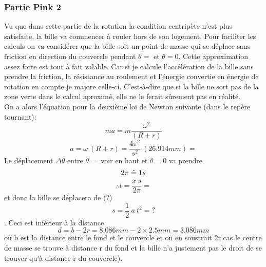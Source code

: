 \subsubsection{Partie Pink 2}
Vu que dans cette partie de la rotation la condition centripète n'est plus satisfaite, la bille va commencer à rouler hors de son logement. Pour faciliter les calculs on va considérer que la bille soit un point de masse qui se déplace sans friction en direction du couvercle pendant $\theta = $%
et $\theta = 0$. 
Cette approximation assez forte est tout à fait valable. Car si je calcule l'accélération de la bille sans prendre la friction, la résistance au roulement et l'énergie convertie en énergie de rotation en compte je majore celle-ci. C'est-à-dire que si la bille ne sort pas de la zone verte dans le calcul aproximé, elle ne le ferait sûrement pas en réalité.\\
On a alors l'équation pour la deuxième loi de Newton suivante (dans le repère tournant):
\[ma = m \frac{\omega^{2}}{(R + r)}\]
\[a = \omega \ (R + r) = \frac{4 \pi^{2}}{s^{2}} \ (26.914mm) = \]
Le déplacement $\Delta\theta$ entre $\theta =$ voir en haut et $\theta = 0$ va prendre
\[2 \pi \mathrel{\hat{=}} 1 s\]
\[\therefore t = \frac{x \ s}{2 \pi} = \]
et donc la bille se déplacera de (?) 
\[s = \frac{1}{2} \ a \ t^{2} = ? \]
.
Ceci est inférieur à la distance 
\[d = b - 2r = 8.086mm - 2 \times 2.5mm = 3.086mm\]
où b est la distance entre le fond et le couvercle et on en soustrait 2r cas le centre de masse se trouve à distance r du fond et la bille n'a justement pas le droit de se trouver qu'à distance r du couvercle).

